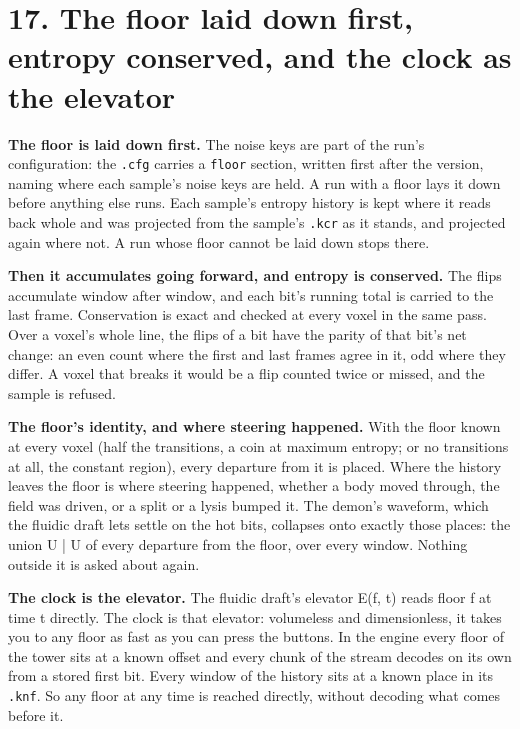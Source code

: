 \section{\texorpdfstring{17. The floor laid down first, entropy conserved, and the clock as the elevator}{17. The floor laid down first, entropy conserved, and the clock as the elevator}}

\textbf{The floor is laid down first.} The noise keys are part of the run's configuration: the \texttt{.\allowbreak{}cfg} carries a \texttt{floor} section, written first after the version, naming where each sample's noise keys are held. A run with a floor lays it down before anything else runs. Each sample's entropy history is kept where it reads back whole and was projected from the sample's \texttt{.\allowbreak{}kcr} as it stands, and projected again where not. A run whose floor cannot be laid down stops there.

\textbf{Then it accumulates going forward, and entropy is conserved.} The flips accumulate window after window, and each bit's running total is carried to the last frame. Conservation is exact and checked at every voxel in the same pass. Over a voxel's whole line, the flips of a bit have the parity of that bit's net change: an even count where the first and last frames agree in it, odd where they differ. A voxel that breaks it would be a flip counted twice or missed, and the sample is refused.

\textbf{The floor's identity, and where steering happened.} With the floor known at every voxel (half the transitions, a coin at maximum entropy; or no transitions at all, the constant region), every departure from it is placed. Where the history leaves the floor is where steering happened, whether a body moved through, the field was driven, or a split or a lysis bumped it. The demon's waveform, which the fluidic draft lets settle on the hot bits, collapses onto exactly those places: the union U | U of every departure from the floor, over every window. Nothing outside it is asked about again.

\textbf{The clock is the elevator.} The fluidic draft's elevator E(f, t) reads floor f at time t directly. The clock is that elevator: volumeless and dimensionless, it takes you to any floor as fast as you can press the buttons. In the engine every floor of the tower sits at a known offset and every chunk of the stream decodes on its own from a stored first bit. Every window of the history sits at a known place in its \texttt{.\allowbreak{}knf}. So any floor at any time is reached directly, without decoding what comes before it.

